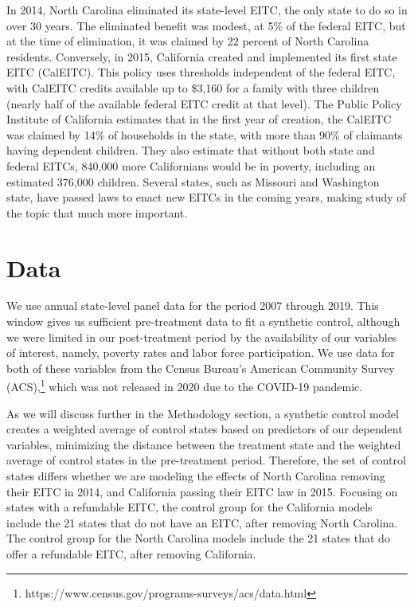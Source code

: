 \documentclass{article}
\begin{document}
In 2014, North Carolina eliminated its state-level EITC, the only state to do so in over 30 years. The eliminated benefit was modest, at 5\% of the federal EITC, but at the time of elimination, it was claimed by 22 percent of North Carolina residents. Conversely, in 2015, California created and implemented its first state EITC (CalEITC). This policy uses thresholds independent of the federal EITC, with CalEITC credits available up to \$3,160 for a family with three children (nearly half of the available federal EITC credit at that level). The Public Policy Institute of California estimates that in the first year of creation, the CalEITC was claimed by 14\% of households in the state, with more than 90\% of claimants having dependent children. They also estimate that without both state and federal EITCs, 840,000 more Californians would be in poverty, including an estimated 376,000 children. Several states, such as Missouri and Washington state, have passed laws to enact new EITCs in the coming years, making study of the topic that much more important. 


\section{Data}

We use annual state-level panel data for the period 2007 through 2019. This window gives us sufficient pre-treatment data to fit a synthetic control, although we were limited in our post-treatment period by the availability of our variables of interest, namely, poverty rates and labor force participation. We use data for both of these variables from the Census Bureau's American Community Survey (ACS),\footnote{https://www.census.gov/programs-surveys/acs/data.html} which was not released in 2020 due to the COVID-19 pandemic. 

As we will discuss further in the Methodology section, a synthetic control model creates a weighted average of control states based on predictors of our dependent variables, minimizing the distance between the treatment state and the weighted average of control states in the pre-treatment period. Therefore, the set of control states differs whether we are modeling the effects of North Carolina removing their EITC in 2014, and California passing their EITC law in 2015. Focusing on states with a refundable EITC, the control group for the California models include the 21 states that do not have an EITC, after removing North Carolina. The control group for the North Carolina models include the 21 states that do offer a refundable EITC, after removing California.
\end{document}
